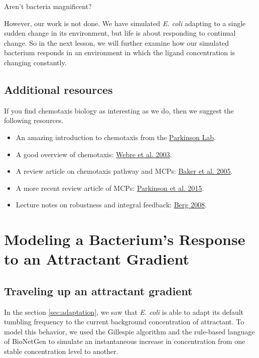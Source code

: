 Aren't bacteria magnificent?

However, our work is not done. We have simulated \textit{E. coli} adapting to a single sudden change in its environment, but life is about responding to continual change. So in the next lesson, we will further examine how our simulated bacterium responds in an environment in which the ligand concentration is changing constantly.


\FloatBarrier
{}
\subsection{Additional resources}

If you find chemotaxis biology as interesting as we do, then we suggest the following resources.
\begin{itemize}
 \item An amazing introduction to chemotaxis from the \href{http://chemotaxis.biology.utah.edu/Parkinson_Lab/projects/ecolichemotaxis/ecolichemotaxis.html}{Parkinson Lab}.
 \item A good overview of chemotaxis: \href{https://doi.org/10.1016/S0960-9822(02)01424-0)}{Webre et al. 2003}.
 \item A review article on chemotaxis pathway and MCPs: \href{https://pubmed.ncbi.nlm.nih.gov/16369945}{Baker et al. 2005}.
 \item A more recent review article of MCPs: \href{https://www.sciencedirect.com/science/article/abs/pii/S0966842X15000578}{Parkinson et al. 2015}.
 \item Lecture notes on robustness and integral feedback: \href{https://www.weizmann.ac.il/mcb/UriAlon/sites/mcb.UriAlon/files/uploads/lecture_notes_-_robustness_in_bacterial_chemotaxis_.pdf}{Berg 2008}.
\end{itemize}


\FloatBarrier
{}

\section{Modeling a Bacterium's Response to an Attractant Gradient}
\label{sec:gradient}

\subsection{Traveling up an attractant gradient}


In the section \autoref{sec:adaptation}, we saw that \textit{E. coli} is able to adapt its default tumbling frequency to the current background concentration of attractant. To model this behavior, we used the Gillespie algorithm and the rule-based language of BioNetGen to simulate an instantaneous increase in concentration from one stable concentration level to another.

